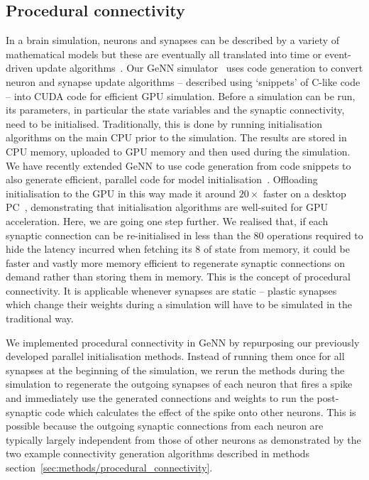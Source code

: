 \documentclass[9pt,a4paper]{amsart}
\begin{document}
\subsection{Procedural connectivity}
\label{sec:results/procedural}
In a brain simulation, neurons and synapses can be described by a variety of mathematical models but these are eventually all translated into time or event-driven update algorithms~\citep{Brette2007}.
Our GeNN simulator~\citep{Yavuz2016} uses code generation to convert neuron and synapse update algorithms -- described using `snippets' of C-like code -- into CUDA code for efficient GPU simulation.
Before a simulation can be run, its parameters, in particular the state variables and the synaptic connectivity, need to be initialised.
Traditionally, this is done by running initialisation algorithms on the main CPU prior to the simulation.
The results are stored in CPU memory, uploaded to GPU memory and then used during the simulation.
We have recently extended GeNN to use code generation from code snippets to also generate efficient, parallel code for model initialisation~\citep{Knight2018}.
Offloading initialisation to the GPU in this way made it around $20\times$ faster on a desktop PC~\citep{Knight2018}, demonstrating that initialisation algorithms are well-suited for GPU acceleration.
Here, we are going one step further.
We realised that, if each synaptic connection can be re-initialised in less than the 80 operations required to hide the latency incurred when fetching its \SI{8}{\byte} of state from memory, it could be faster and vastly more memory efficient to regenerate synaptic connections on demand rather than storing them in memory.
This is the concept of procedural connectivity.
It is applicable whenever synapses are static -- plastic synapses which change their weights during a simulation will have to be simulated in the traditional way.

We implemented procedural connectivity in GeNN by repurposing our previously developed parallel initialisation methods.
Instead of running them once for all synapses at the beginning of the simulation, we rerun the methods during the simulation to regenerate the outgoing synapses of each neuron that fires a spike and immediately use the generated connections and weights to run the post-synaptic code which calculates the effect of the spike onto other neurons.
This is possible because the outgoing synaptic connections from each neuron are typically largely independent from those of other neurons as demonstrated by the two example connectivity generation algorithms described in methods section~\ref{sec:methods/procedural_connectivity}.
\end{document}
